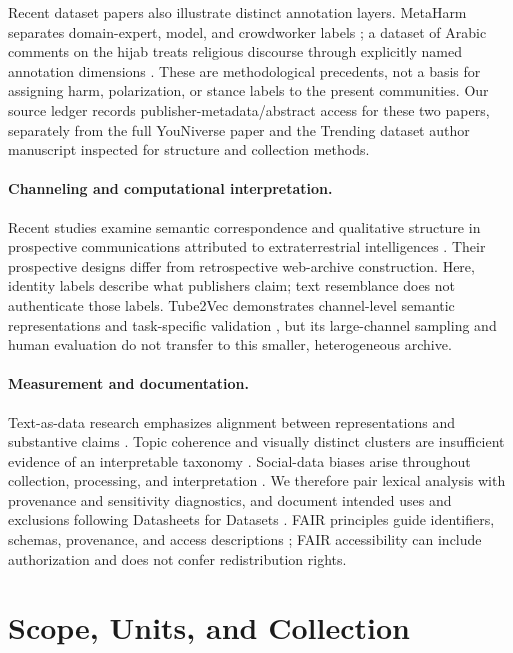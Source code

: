 Recent dataset papers also illustrate distinct annotation layers. MetaHarm separates domain-expert, model, and crowdworker labels \citep{jo2025metaharm}; a dataset of Arabic comments on the hijab treats religious discourse through explicitly named annotation dimensions \citep{heraki2025hijab}. These are methodological precedents, not a basis for assigning harm, polarization, or stance labels to the present communities. Our source ledger records publisher-metadata/abstract access for these two papers, separately from the full YouNiverse paper and the Trending dataset author manuscript inspected for structure and collection methods.

\paragraph{Channeling and computational interpretation.}
Recent studies examine semantic correspondence and qualitative structure in prospective communications attributed to extraterrestrial intelligences \citep{wahbeh2026semantic,wahbeh2026qualitative}. Their prospective designs differ from retrospective web-archive construction. Here, identity labels describe what publishers claim; text resemblance does not authenticate those labels. Tube2Vec demonstrates channel-level semantic representations and task-specific validation \citep{boesinger2024tube2vec}, but its large-channel sampling and human evaluation do not transfer to this smaller, heterogeneous archive.

\paragraph{Measurement and documentation.}
Text-as-data research emphasizes alignment between representations and substantive claims \citep{grimmer2013text}. Topic coherence and visually distinct clusters are insufficient evidence of an interpretable taxonomy \citep{doogan2021twaddle,schroeder2025reliability}. Social-data biases arise throughout collection, processing, and interpretation \citep{olteanu2019social}. We therefore pair lexical analysis with provenance and sensitivity diagnostics, and document intended uses and exclusions following Datasheets for Datasets \citep{gebru2021datasheets}. FAIR principles guide identifiers, schemas, provenance, and access descriptions \citep{wilkinson2016fair}; FAIR accessibility can include authorization and does not confer redistribution rights.

\section{Scope, Units, and Collection}

